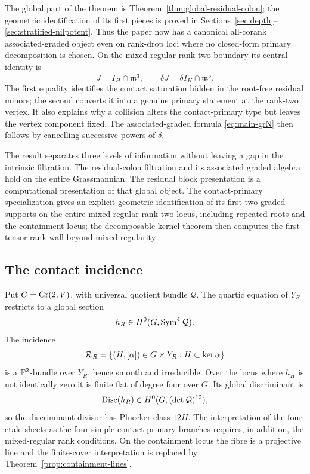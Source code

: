 The global part of the theorem is
Theorem~\ref{thm:global-residual-colon}; the geometric identification
of its first pieces is proved in
Sections~\ref{sec:depth}--\ref{sec:stratified-nilpotent}.  Thus the
paper now has a canonical all-corank associated-graded object even on
rank-drop loci where no closed-form primary decomposition is chosen.
On the mixed-regular rank-two boundary its central identity is
\[
 J=I_H\cap\mathfrak m^3,\qquad
 \delta J=\delta I_H\cap\mathfrak m^5.
\]
The first equality identifies the contact saturation hidden in the
root-free residual minors; the second converts it into a genuine
primary statement at the rank-two vertex.  It also explains why a
collision alters the contact-primary type but leaves the vertex
component fixed.  The associated-graded formula
\eqref{eq:main-grN} then follows by cancelling successive powers of
\(\delta\).

The result separates three levels of information without leaving a
gap in the intrinsic filtration.  The residual-colon filtration and
its associated graded algebra hold on the entire Grassmannian.  The
residual block presentation is a computational presentation of that
global object.  The contact-primary specialization gives an explicit
geometric identification of its first two graded supports on the
entire mixed-regular rank-two locus, including repeated roots and the
containment locus; the decomposable-kernel theorem then computes the
first tensor-rank wall beyond mixed regularity.

\subsection*{The contact incidence}

Put \(G=\operatorname{Gr}(2,V)\), with universal quotient bundle \(\mathcal Q\).
The quartic equation of \(Y_R\) restricts to a global section
\[
 h_R\in H^0(G,\operatorname{Sym}^4\mathcal Q).
\]
The incidence
\[
 \mathcal R_R=
 \{(H,[\alpha])\in G\times Y_R:
                 H\subset\ker\alpha\}
\]
is a \(\mathbb P^2\)-bundle over \(Y_R\), hence smooth and irreducible.
Over the locus where \(h_H\) is not identically zero it is finite
flat of degree four over \(G\).  Its global discriminant is
\[
 \operatorname{Disc}(h_R)\in H^0(G,(\det\mathcal Q)^{12}),
\]
so the discriminant divisor has Pluecker class \(12H\).  The
interpretation of the four etale sheets as the four simple-contact
primary branches requires, in addition, the mixed-regular rank
conditions.  On the containment locus the fibre is a projective line
and the finite-cover interpretation is replaced by
Theorem~\ref{prop:containment-lines}.

